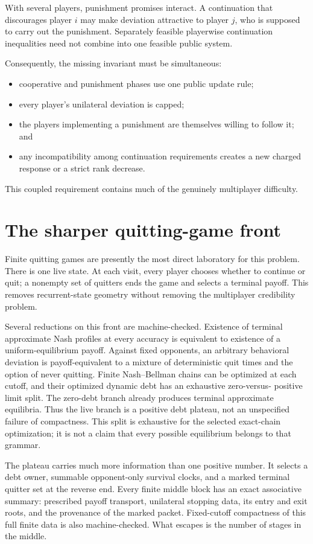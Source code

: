 \documentclass[11pt]{article}
\begin{document}
With several players, punishment promises interact.  A continuation that
discourages player \(i\) may make deviation attractive to player \(j\), who
is supposed to carry out the punishment.  Separately feasible playerwise
continuation inequalities need not combine into one feasible public system.

Consequently, the missing invariant must be simultaneous:
\begin{itemize}
  \item cooperative and punishment phases use one public update rule;
  \item every player's unilateral deviation is capped;
  \item the players implementing a punishment are themselves willing to
        follow it; and
  \item any incompatibility among continuation requirements creates a new
        charged response or a strict rank decrease.
\end{itemize}
This coupled requirement contains much of the genuinely multiplayer
difficulty.

\section{The sharper quitting-game front}

Finite quitting games are presently the most direct laboratory for this
problem.  There is one live state.  At each visit, every player chooses
whether to continue or quit; a nonempty set of quitters ends the game and
selects a terminal payoff.  This removes recurrent-state geometry without
removing the multiplayer credibility problem.

Several reductions on this front are machine-checked.  Existence of terminal
approximate Nash profiles at every accuracy is equivalent to existence of a
uniform-equilibrium payoff.  Against fixed opponents, an arbitrary behavioral
deviation is payoff-equivalent to a mixture of deterministic quit times and
the option of never quitting.  Finite Nash--Bellman chains can be optimized at
each cutoff, and their optimized dynamic debt has an exhaustive zero-versus-
positive limit split.  The zero-debt branch already produces terminal
approximate equilibria.  Thus the live branch is a positive debt plateau, not
an unspecified failure of compactness.  This split is exhaustive for the
selected exact-chain optimization; it is not a claim that every possible
equilibrium belongs to that grammar.

The plateau carries much more information than one positive number.  It
selects a debt owner, summable opponent-only survival clocks, and a marked
terminal quitter set at the reverse end.  Every finite middle block has an
exact associative summary: prescribed payoff transport, unilateral stopping
data, its entry and exit roots, and the provenance of the marked packet.
Fixed-cutoff compactness of this full finite data is also machine-checked.
What escapes is the number of stages in the middle.
\end{document}
